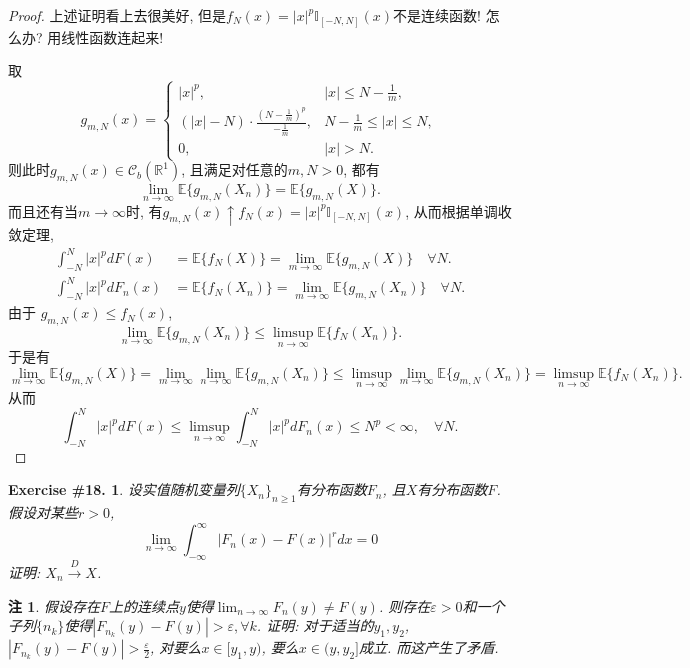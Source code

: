 \documentclass[UTF8, a4paper]{article}
\newtheorem{exercise}{Exercise \#18.}
\newtheorem*{remark}{注}
\begin{document}
\begin{proof}
上述证明看上去很美好, 但是\(f_N(x) = |x|^p \mathbb{I}_{[-N,N]}(x)\)不是连续函数!
怎么办? 用线性函数连起来!

取
$$
g_{m,N}(x) = \begin{cases}
    |x|^p, & |x| \leq N - \frac{1}{m}, \\
    (|x| - N) \cdot \frac{\left(N - \frac{1}{m}\right)^p}{-\frac{1}{m}}, & N - \frac{1}{m} \leq |x| \leq N, \\
    0, & |x| > N.
\end{cases}
$$
则此时\(g_{m,N}(x) \in \mathscr{C}_b(\mathbb{R}^1)\), 且满足对任意的\(m,N > 0\), 都有 
$$
\lim_{n\to \infty} \mathbb{E}\{g_{m,N}(X_n)\} = \mathbb{E}\{g_{m,N}(X)\}.
$$
而且还有当\(m \to\infty\)时, 有\(g_{m,N}(x) \uparrow f_N(x) = |x|^p \mathbb{I}_{[-N,N]}(x)\), 从而根据单调收敛定理,
$$
\begin{aligned}
    \int_{-N}^{N} |x|^p dF(x) &= \mathbb{E}\{f_N(X)\} = \lim_{m\to\infty} \mathbb{E}\{g_{m,N}(X)\} \quad \forall N. \\
    \int_{-N}^{N} |x|^p dF_n(x) &= \mathbb{E}\{f_N(X_n)\} = \lim_{m\to\infty} \mathbb{E}\{g_{m,N}(X_n)\} \quad \forall N.
\end{aligned}
$$
由于 \(g_{m,N}(x) \leq f_N(x)\), 
$$
\lim_{n\to\infty} \mathbb{E}\{g_{m,N}(X_n)\} \leq \limsup_{n\to\infty} \mathbb{E}\{f_N(X_n)\}.
$$
于是有
$$
\lim_{m\to\infty} \mathbb{E}\{g_{m,N}(X)\} = \lim_{m\to\infty} \lim_{n\to\infty} \mathbb{E}\{g_{m,N}(X_n)\} \leq \limsup_{n\to\infty} \lim_{m\to\infty} \mathbb{E}\{g_{m,N}(X_n)\} = \limsup_{n\to\infty} \mathbb{E}\{f_N(X_n)\}.
$$
从而 
$$
\int_{-N}^{N} |x|^p dF(x) \leq \limsup_{n\to\infty} \int_{-N}^{N} |x|^p dF_n(x) \leq N^p < \infty, \quad \forall N.
$$


\end{proof}


\begin{framed}
\begin{exercise}
设实值随机变量列\(\{X_n\}_{n\geq 1}\)有分布函数\(F_n\), 且\(X\)有分布函数\(F\). 假设对某些\(r >0\), 
$$
\lim _{n \rightarrow \infty} \int_{-\infty}^{\infty}\left|F_n(x)-F(x)\right|^r d x=0
$$
证明: \(X_n \xrightarrow{D}X\).
\end{exercise}
\end{framed}

\begin{remark}
假设存在\(F\)上的连续点\(y\)使得\(\lim_{n\to\infty} F_n(y) \neq F(y)\).
则存在\(\varepsilon > 0\)和一个子列\(\{n_k\}\)使得\(|F_{n_k}(y) - F(y)| > {\varepsilon}, \forall k\).
证明: 对于适当的\(y_1,y_2\), \(|F_{n_k}(y) - F(y)| > \frac{\varepsilon}{2}\), 对要么\(x \in [y_1, y)\), 要么\(x \in (y, y_2]\)成立.
而这产生了矛盾.
\end{remark}
\end{document}
